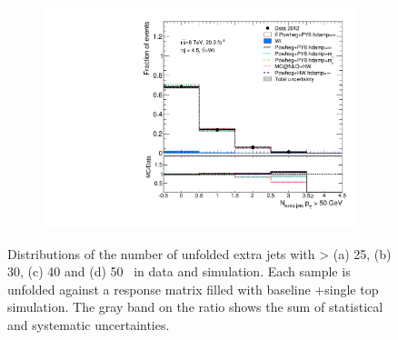 \begin{figure}
\begin{subfigure}[]{0.45\textwidth}
\end{subfigure}
\begin{subfigure}[]{0.45\textwidth}
\includegraphics[width=\textwidth]{fig/DataUnfold/NLO/NExtraJets50.pdf}
\end{subfigure}
\caption{Distributions of the number of unfolded extra jets with \pt > (a) 25, (b) 30, (c) 40 and (d) 50 \GeV\ in data and simulation.  Each sample is unfolded against a response matrix filled with baseline \ttbar+single top simulation. The gray band on the ratio shows the sum of statistical and systematic uncertainties.}
\label{fig:unfmult}
\end{figure}


